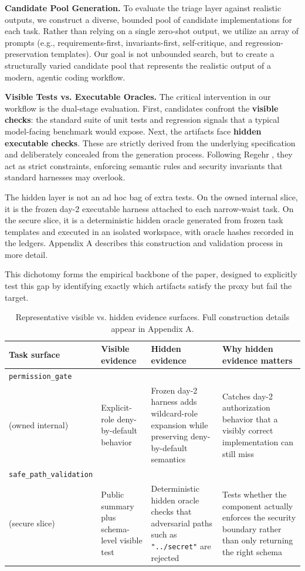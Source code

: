 \documentclass[11pt]{article}
\begin{document}
\textbf{Candidate Pool Generation.}
To evaluate the triage layer against realistic outputs, we construct a diverse, bounded pool of candidate implementations for each task. Rather than relying on a single zero-shot output, we utilize an array of prompts (e.g., requirements-first, invariants-first, self-critique, and regression-preservation templates). Our goal is not unbounded search, but to create a structurally varied candidate pool that represents the realistic output of a modern, agentic coding workflow.

\textbf{Visible Tests vs. Executable Oracles.}
The critical intervention in our workflow is the dual-stage evaluation. First, candidates confront the \textbf{visible checks}: the standard suite of unit tests and regression signals that a typical model-facing benchmark would expose. Next, the artifacts face \textbf{hidden executable checks}. These are strictly derived from the underlying specification and deliberately concealed from the generation process. Following Regehr \cite{Regehr2026ZeroDOF}, they act as strict constraints, enforcing semantic rules and security invariants that standard harnesses may overlook.

The hidden layer is not an ad hoc bag of extra tests. On the owned internal slice, it is the frozen day-2 executable harness attached to each narrow-waist task. On the secure slice, it is a deterministic hidden oracle generated from frozen task templates and executed in an isolated workspace, with oracle hashes recorded in the ledgers. Appendix A describes this construction and validation process in more detail.

This dichotomy forms the empirical backbone of the paper, designed to explicitly test this gap by identifying exactly which artifacts satisfy the proxy but fail the target.

\begin{table}[h]
\centering
\small
\renewcommand{\arraystretch}{1.1}
\caption{Representative visible vs. hidden evidence surfaces. Full construction details appear in Appendix A.}
\label{tab:visible-hidden-examples}
\begin{tabular}{p{1.55in}p{1.35in}p{1.5in}p{1.4in}}
\hline
Task surface & Visible evidence & Hidden evidence & Why hidden evidence matters \\
\hline
\texttt{permission\_gate}\\(owned internal) & Explicit-role deny-by-default behavior & Frozen day-2 harness adds wildcard-role expansion while preserving deny-by-default semantics & Catches day-2 authorization behavior that a visibly correct implementation can still miss \\
\texttt{safe\_path\_validation}\\(secure slice) & Public summary plus schema-level visible test & Deterministic hidden oracle checks that adversarial paths such as \texttt{"../secret"} are rejected & Tests whether the component actually enforces the security boundary rather than only returning the right schema \\
\hline
\end{tabular}
\end{table}
\end{document}
